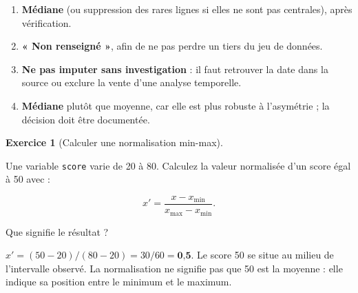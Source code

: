 \documentclass[
  french,
  letterpaper,
  open=any]{scrbook}
\providecommand{\tightlist}{%
  \setlength{\itemsep}{0pt}\setlength{\parskip}{0pt}}
\theoremstyle{definition}
\theoremstyle{definition}
\newtheorem{exercise}{Exercice}[section]
\theoremstyle{remark}
\begin{document}
\begin{tcolorbox}[enhanced jigsaw, arc=.35mm, bottomrule=.15mm, bottomtitle=1mm, breakable, colback=white, colbacktitle=quarto-callout-tip-color!10!white, colframe=quarto-callout-tip-color-frame, coltitle=black, left=2mm, leftrule=.75mm, opacityback=0, opacitybacktitle=0.6, rightrule=.15mm, title=\textcolor{quarto-callout-tip-color}{\faLightbulb}\hspace{0.5em}{Solution de l'exercice Exercice~\ref{exr-prep-5}}, titlerule=0mm, toprule=.15mm, toptitle=1mm]

\begin{enumerate}
\def\labelenumi{\alph{enumi}.}
\tightlist
\item
  \textbf{Médiane} (ou suppression des rares lignes si elles ne sont pas
  centrales), après vérification.
\item
  \textbf{« Non renseigné »}, afin de ne pas perdre un tiers du jeu de
  données.
\item
  \textbf{Ne pas imputer sans investigation} : il faut retrouver la date
  dans la source ou exclure la vente d'une analyse temporelle.
\item
  \textbf{Médiane} plutôt que moyenne, car elle est plus robuste à
  l'asymétrie ; la décision doit être documentée.
\end{enumerate}

\end{tcolorbox}

\begin{exercise}[Calculer une normalisation
min-max]\protect\hypertarget{exr-prep-6}{}\label{exr-prep-6}

Une variable \texttt{score} varie de 20 à 80. Calculez la valeur
normalisée d'un score égal à 50 avec :

\[x'=\frac{x-x_{\min}}{x_{\max}-x_{\min}}.\]

Que signifie le résultat ?

\end{exercise}

\begin{tcolorbox}[enhanced jigsaw, arc=.35mm, bottomrule=.15mm, bottomtitle=1mm, breakable, colback=white, colbacktitle=quarto-callout-tip-color!10!white, colframe=quarto-callout-tip-color-frame, coltitle=black, left=2mm, leftrule=.75mm, opacityback=0, opacitybacktitle=0.6, rightrule=.15mm, title=\textcolor{quarto-callout-tip-color}{\faLightbulb}\hspace{0.5em}{Solution de l'exercice Exercice~\ref{exr-prep-6}}, titlerule=0mm, toprule=.15mm, toptitle=1mm]

\(x'=(50-20)/(80-20)=30/60=\textbf{0,5}\). Le score 50 se situe au
milieu de l'intervalle observé. La normalisation ne signifie pas que 50
est la moyenne : elle indique sa position entre le minimum et le
maximum.

\end{tcolorbox}
\end{document}
